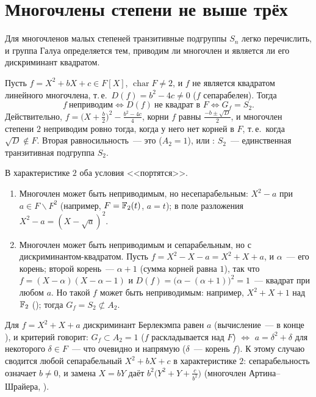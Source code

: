 \section{Многочлены степени не выше трёх}

Для многочленов малых степеней транзитивные подгруппы $S_n$ легко перечислить, и группа Галуа определяется
тем, приводим ли многочлен и является ли его дискриминант квадратом.

\begin{example}[4.6]
Пусть $f=X^2+bX+c\in F[X]$, $\operatorname{char}F\ne2$, и $f$ не является квадратом линейного многочлена, т.\,е.\
$D(f)=b^2-4c\ne0$ ($f$ сепарабелен). Тогда
\[
f\ \text{неприводим}\iff D(f)\ \text{не квадрат в }F\iff G_f=S_2 .
\]
Действительно, $f=\bigl(X+\frac b2\bigr)^2-\frac{b^2-4c}4$, корни $f$ равны $\frac{-b\pm\sqrt{D}}2$, и многочлен степени $2$
неприводим ровно тогда, когда у него нет корней в $F$, т.\,е.\ когда $\sqrt D\notin F$. Вторая равносильность~--- это
\rf{4.2} ($A_2=1$), или \rf{4.5}: $S_2$~--- единственная транзитивная подгруппа $S_2$.

В характеристике $2$ оба условия <<портятся>>.
\begin{enumerate}[label=(\alph*)]
\item Многочлен может быть неприводимым, но несепарабельным: $X^2-a$ при $a\in F\smallsetminus F^2$ (например, $F=\mathbb F_2(t)$,
$a=t$); в поле разложения $X^2-a=(X-\sqrt a)^2$.
\item Многочлен может быть неприводимым и сепарабельным, но с дискриминантом-квадратом. Пусть $f=X^2-X-a=X^2+X+a$, и
$\alpha$~--- его корень; второй корень~--- $\alpha+1$ (сумма корней равна $1$), так что $f=(X-\alpha)(X-\alpha-1)$ и
$D(f)=\bigl(\alpha-(\alpha+1)\bigr)^2=1$~--- квадрат при любом $a$. Но такой $f$ может быть неприводимым:
например, $X^2+X+1$ над $\mathbb F_2$ (\rf{4.4}); тогда $G_f=S_2\not\subset A_2$.
\end{enumerate}
Для $f=X^2+X+a$ дискриминант Берлекэмпа равен $a$ (вычисление~--- в конце ), и критерий 
говорит: $G_f\subset A_2=1$ ($f$ раскладывается над $F$) $\iff$ $a=\delta^2+\delta$ для некоторого $\delta\in F$~--- что очевидно и
напрямую ($\delta$~--- корень $f$). К этому случаю сводится любой сепарабельный $X^2+bX+c$ в характеристике $2$: сепарабельность
означает $b\ne0$, и замена $X=bY$ даёт $b^2\bigl(Y^2+Y+\frac c{b^2}\bigr)$ (многочлен Артина--Шрайера, \rf{2.22b}).
\end{example}

